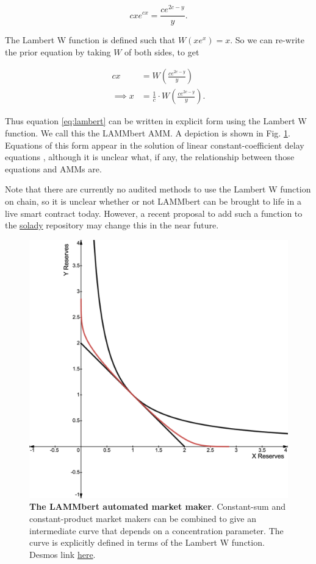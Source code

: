 \documentclass[bibliography=numbered]{article}
\begin{document}
\begin{equation}
\label{eq:lambert}
    cxe^{cx}
    = 
    \frac{ce^{2c-y}}{y}.
\end{equation}

The Lambert W function is defined such that $W(xe^x) = x$. So we can re-write the prior equation by taking $W$ of both sides, to get

\begin{align}
\label{eq:lambert-2}
    cx
    &= 
    W\left( \frac{ce^{2c-y}}{y} \right) \\ \nonumber
    \implies
    x
    &=
    \frac{1}{c} \cdot W\left( \frac{ce^{2c-y}}{y} \right).
\end{align}

Thus equation \eqref{eq:lambert} can be written in explicit form using the Lambert W function. We call this the LAMMbert AMM. A depiction is shown in Fig. \ref{fig:lambertw}. Equations of this form appear in the solution of linear constant-coefficient delay equations \cite{corless1996lambert}, although it is unclear what, if any, the relationship between those equations and AMMs are. 

Note that there are currently no audited methods to use the Lambert W function on chain, so it is unclear whether or not LAMMbert can be brought to life in a live smart contract today. However, a recent proposal to add such a function to the \href{https://github.com/Vectorized/solady/pull/706}{solady} repository may change this in the near future.

\begin{figure}
    \centering
    \includegraphics[width=0.5\linewidth]{lambertw.png}
    \caption{\textbf{The LAMMbert automated market maker}. Constant-sum and constant-product market makers can be combined to give an intermediate curve that depends on a concentration parameter. The curve is explicitly defined in terms of the Lambert W function. Desmos link \href{https://www.desmos.com/calculator/uvlxqb1hyz}{here}.}
    \label{fig:lambertw}
\end{figure}

\printbibliography %
\end{document}
